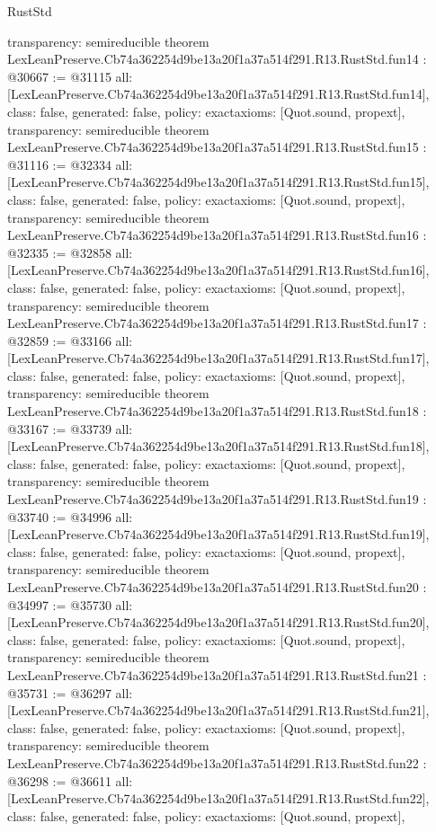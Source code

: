 \begin{lexlean}{RustStd}
\begin{coremodule}
{  transparency: semireducible
}
theorem LexLeanPreserve.Cb74a362254d9be13a20f1a37a514f291.R13.RustStd.fun14 : @30667 := @31115 {
  all: [LexLeanPreserve.Cb74a362254d9be13a20f1a37a514f291.R13.RustStd.fun14],
  class: false,
  generated: false,
  policy: exact{axioms: [Quot.sound, propext]},
  transparency: semireducible
}
theorem LexLeanPreserve.Cb74a362254d9be13a20f1a37a514f291.R13.RustStd.fun15 : @31116 := @32334 {
  all: [LexLeanPreserve.Cb74a362254d9be13a20f1a37a514f291.R13.RustStd.fun15],
  class: false,
  generated: false,
  policy: exact{axioms: [Quot.sound, propext]},
  transparency: semireducible
}
theorem LexLeanPreserve.Cb74a362254d9be13a20f1a37a514f291.R13.RustStd.fun16 : @32335 := @32858 {
  all: [LexLeanPreserve.Cb74a362254d9be13a20f1a37a514f291.R13.RustStd.fun16],
  class: false,
  generated: false,
  policy: exact{axioms: [Quot.sound, propext]},
  transparency: semireducible
}
theorem LexLeanPreserve.Cb74a362254d9be13a20f1a37a514f291.R13.RustStd.fun17 : @32859 := @33166 {
  all: [LexLeanPreserve.Cb74a362254d9be13a20f1a37a514f291.R13.RustStd.fun17],
  class: false,
  generated: false,
  policy: exact{axioms: [Quot.sound, propext]},
  transparency: semireducible
}
theorem LexLeanPreserve.Cb74a362254d9be13a20f1a37a514f291.R13.RustStd.fun18 : @33167 := @33739 {
  all: [LexLeanPreserve.Cb74a362254d9be13a20f1a37a514f291.R13.RustStd.fun18],
  class: false,
  generated: false,
  policy: exact{axioms: [Quot.sound, propext]},
  transparency: semireducible
}
theorem LexLeanPreserve.Cb74a362254d9be13a20f1a37a514f291.R13.RustStd.fun19 : @33740 := @34996 {
  all: [LexLeanPreserve.Cb74a362254d9be13a20f1a37a514f291.R13.RustStd.fun19],
  class: false,
  generated: false,
  policy: exact{axioms: [Quot.sound, propext]},
  transparency: semireducible
}
theorem LexLeanPreserve.Cb74a362254d9be13a20f1a37a514f291.R13.RustStd.fun20 : @34997 := @35730 {
  all: [LexLeanPreserve.Cb74a362254d9be13a20f1a37a514f291.R13.RustStd.fun20],
  class: false,
  generated: false,
  policy: exact{axioms: [Quot.sound, propext]},
  transparency: semireducible
}
theorem LexLeanPreserve.Cb74a362254d9be13a20f1a37a514f291.R13.RustStd.fun21 : @35731 := @36297 {
  all: [LexLeanPreserve.Cb74a362254d9be13a20f1a37a514f291.R13.RustStd.fun21],
  class: false,
  generated: false,
  policy: exact{axioms: [Quot.sound, propext]},
  transparency: semireducible
}
theorem LexLeanPreserve.Cb74a362254d9be13a20f1a37a514f291.R13.RustStd.fun22 : @36298 := @36611 {
  all: [LexLeanPreserve.Cb74a362254d9be13a20f1a37a514f291.R13.RustStd.fun22],
  class: false,
  generated: false,
  policy: exact{axioms: [Quot.sound, propext]},
}
\end{coremodule}
\end{lexlean}
